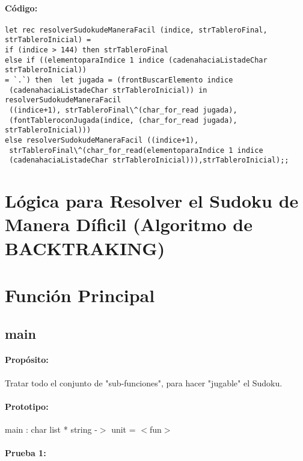 \paragraph{Código:}
\begin{verbatim}
let rec resolverSudokudeManeraFacil (indice, strTableroFinal, strTableroInicial) = 
if (indice > 144) then strTableroFinal
else if ((elementoparaIndice 1 indice (cadenahaciaListadeChar strTableroInicial)) 
= `.`) then  let jugada = (frontBuscarElemento indice 
 (cadenahaciaListadeChar strTableroInicial)) in  resolverSudokudeManeraFacil 
 ((indice+1), strTableroFinal\^(char_for_read jugada),
 (fontTableroconJugada(indice, (char_for_read jugada), strTableroInicial)))
else resolverSudokudeManeraFacil ((indice+1), 
 strTableroFinal\^(char_for_read(elementoparaIndice 1 indice
 (cadenahaciaListadeChar strTableroInicial))),strTableroInicial);;
\end{verbatim}

\section{Lógica para Resolver el Sudoku de Manera D\'ificil (Algoritmo de
BACKTRAKING)}

\section{Función Principal}

\subsection{main}

\paragraph{Propósito:} Tratar todo el conjunto de "sub-funciones", para hacer "jugable" el
Sudoku.
\paragraph{Prototipo:} main : char list * string -$>$ unit = $<$fun$>$
\paragraph{Prueba 1:}
